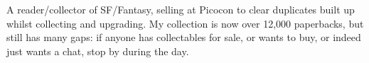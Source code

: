 A reader/collector of SF/Fantasy, selling at Picocon to
clear duplicates built up whilst collecting and upgrading. My
collection is now over 12,000 paperbacks, but still has many gaps: if
anyone has collectables for sale, or wants to buy, or indeed just
wants a chat, stop by during the day.
